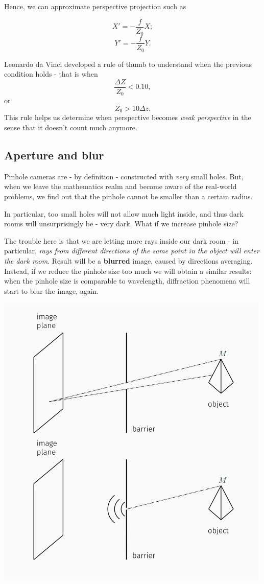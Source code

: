 \documentclass[10pt]{report}
\begin{document}
Hence, we can approximate perspective projection such as

\[ X' = -\frac{f}{Z_0}X;\] \[ Y' = -\frac{f}{Z_0}Y.\]

Leonardo da Vinci developed a rule of thumb to understand when the
previous condition holds - that is when \[\frac{\Delta Z}{Z_0} < 0.10,\] or $$Z_0 > 10\Delta z.$$
This rule helps us determine when perspective becomes \emph{weak perspective}
in the sense that it doesn't count much anymore.

\subsection{Aperture and blur}
\label{aperture-and-blur}
Pinhole cameras are - by definition - constructed with \emph{very} small
holes. But, when we leave the mathematics realm and become aware of the
real-world problems, we find out that the pinhole cannot be smaller than
a certain radius.

In particular, too small holes will not allow much light inside, and
thus dark rooms will unsurprisingly be - very dark. What if we increase
pinhole size?

The trouble here is that we are letting more rays inside our dark room -
in particular, \emph{rays from different directions of the same point in the
object will enter the dark room}. Result will be a \textbf{blurred} image,
caused by directions averaging. Instead, if we reduce the pinhole size
too much we will obtain a similar results: when the pinhole size is
comparable to wavelength, diffraction phenomena will start to blur the
image, again.

\begin{center}
\includegraphics[width=.9\linewidth]{./pics/visio/pinhole3.jpg}
\end{center}
\end{document}
